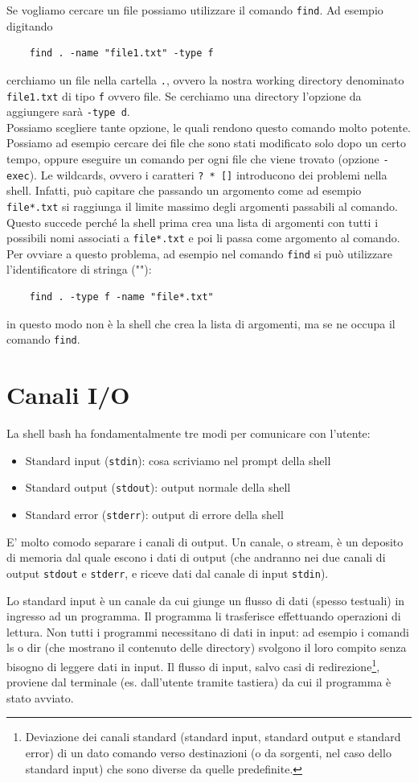 \documentclass[11pt]{book}
\begin{document}
Se vogliamo cercare un file possiamo utilizzare il comando \verb"find". Ad esempio digitando 
\begin{verbatim}
	find . -name "file1.txt" -type f
\end{verbatim}
cerchiamo un file nella cartella \verb".", ovvero la nostra working directory denominato \verb"file1.txt" di tipo \verb"f" ovvero file. Se cerchiamo una directory l'opzione da aggiungere sarà \verb"-type d".\\
Possiamo scegliere tante opzione, le quali rendono questo comando molto potente. Possiamo ad esempio cercare dei file che sono stati modificato solo dopo un certo tempo, oppure eseguire un comando per ogni file che viene trovato (opzione \verb"-exec"). Le wildcards, ovvero i caratteri \verb"? * []" introducono dei problemi nella shell. Infatti, può capitare che passando un argomento come ad esempio \verb"file*.txt" si raggiunga il limite massimo degli argomenti passabili al comando. Questo succede perché la shell prima crea una lista di argomenti con tutti i possibili nomi associati a \verb"file*.txt" e poi li passa come argomento al comando. Per ovviare a questo problema, ad esempio nel comando \verb"find" si può utilizzare l'identificatore di stringa (\verb""""):
\begin{verbatim}
	find . -type f -name "file*.txt"
\end{verbatim}
in questo modo non è la shell che crea la lista di argomenti, ma se ne occupa il comando \verb"find". 

\section{Canali I/O}
La shell bash ha fondamentalmente tre modi per comunicare con l'utente:
\begin{itemize}
	\item Standard input (\verb"stdin"): cosa scriviamo nel prompt della shell
	\item Standard output (\verb"stdout"): output normale della shell
	\item Standard error (\verb"stderr"): output di errore della shell
\end{itemize}
E' molto comodo separare i canali di output. Un canale, o stream, è un deposito di memoria dal quale escono i dati di output (che andranno nei due canali di output \verb"stdout" e \verb"stderr", e riceve dati dal canale di input \verb"stdin"). 

Lo standard input è un canale da cui giunge un flusso di dati (spesso testuali) in ingresso ad un programma. Il programma li trasferisce effettuando operazioni di lettura. Non tutti i programmi necessitano di dati in input: ad esempio i comandi ls o dir (che mostrano il contenuto delle directory) svolgono il loro compito senza bisogno di leggere dati in input.
Il flusso di input, salvo casi di redirezione\footnote{Deviazione dei canali standard (standard input, standard output e standard error) di un dato comando verso destinazioni (o da sorgenti, nel caso dello standard input) che sono diverse da quelle predefinite.}, proviene dal terminale (es. dall'utente tramite tastiera) da cui il programma è stato avviato. 
\end{document}
